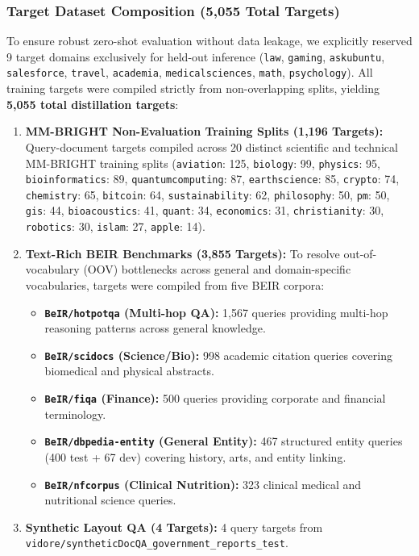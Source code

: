 \documentclass[11pt,a4paper]{article}
\begin{document}
\subsubsection{Target Dataset Composition (5,055 Total Targets)}
To ensure robust zero-shot evaluation without data leakage, we explicitly reserved 9 target domains exclusively for held-out inference (\texttt{law}, \texttt{gaming}, \texttt{askubuntu}, \texttt{salesforce}, \texttt{travel}, \texttt{academia}, \texttt{medicalsciences}, \texttt{math}, \texttt{psychology}). All training targets were compiled strictly from non-overlapping splits, yielding \textbf{5,055 total distillation targets}:
\begin{enumerate}
    \item \textbf{MM-BRIGHT Non-Evaluation Training Splits (1,196 Targets):} Query-document targets compiled across 20 distinct scientific and technical MM-BRIGHT training splits (\texttt{aviation}: 125, \texttt{biology}: 99, \texttt{physics}: 95, \texttt{bioinformatics}: 89, \texttt{quantumcomputing}: 87, \texttt{earthscience}: 85, \texttt{crypto}: 74, \texttt{chemistry}: 65, \texttt{bitcoin}: 64, \texttt{sustainability}: 62, \texttt{philosophy}: 50, \texttt{pm}: 50, \texttt{gis}: 44, \texttt{bioacoustics}: 41, \texttt{quant}: 34, \texttt{economics}: 31, \texttt{christianity}: 30, \texttt{robotics}: 30, \texttt{islam}: 27, \texttt{apple}: 14).
    \item \textbf{Text-Rich BEIR Benchmarks (3,855 Targets):} To resolve out-of-vocabulary (OOV) bottlenecks across general and domain-specific vocabularies, targets were compiled from five BEIR corpora:
    \begin{itemize}
        \item \textbf{\texttt{BeIR/hotpotqa} (Multi-hop QA):} 1,567 queries providing multi-hop reasoning patterns across general knowledge.
        \item \textbf{\texttt{BeIR/scidocs} (Science/Bio):} 998 academic citation queries covering biomedical and physical abstracts.
        \item \textbf{\texttt{BeIR/fiqa} (Finance):} 500 queries providing corporate and financial terminology.
        \item \textbf{\texttt{BeIR/dbpedia-entity} (General Entity):} 467 structured entity queries (400 test + 67 dev) covering history, arts, and entity linking.
        \item \textbf{\texttt{BeIR/nfcorpus} (Clinical Nutrition):} 323 clinical medical and nutritional science queries.
    \end{itemize}
    \item \textbf{Synthetic Layout QA (4 Targets):} 4 query targets from \texttt{vidore/syntheticDocQA\_government\_reports\_test}.
\end{enumerate}
\end{document}
